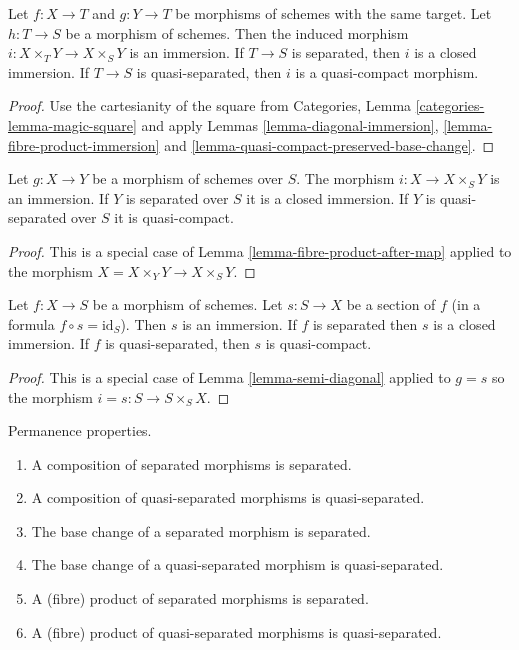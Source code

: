 \begin{lemma}
\label{lemma-fibre-product-after-map}
Let $f : X \to T$ and $g : Y \to T$ be morphisms of schemes
with the same target. Let $h : T \to S$ be a morphism of schemes.
Then the induced morphism $i : X \times_T Y \to X \times_S Y$ is
an immersion. If $T \to S$ is separated, then $i$ is a closed
immersion. If $T \to S$ is quasi-separated, then $i$ is a
quasi-compact morphism.
\end{lemma}

\begin{proof}
Use the cartesianity of the square from Categories,
Lemma \ref{categories-lemma-magic-square} and apply
Lemmas \ref{lemma-diagonal-immersion},
\ref{lemma-fibre-product-immersion} and
\ref{lemma-quasi-compact-preserved-base-change}.
\end{proof}

\begin{lemma}
\label{lemma-semi-diagonal}
Let $g : X \to Y$ be a morphism of schemes over $S$.
The morphism $i : X \to X \times_S Y$ is an immersion.
If $Y$ is separated over $S$ it is a closed immersion.
If $Y$ is quasi-separated over $S$ it is quasi-compact.
\end{lemma}

\begin{proof}
This is a special case of Lemma \ref{lemma-fibre-product-after-map}
applied to the morphism $X = X \times_Y Y \to X \times_S Y$.
\end{proof}

\begin{lemma}
\label{lemma-section-immersion}
Let $f : X \to S$ be a morphism of schemes.
Let $s : S \to X$ be a section of $f$ (in a formula $f \circ s = \text{id}_S$).
Then $s$ is an immersion.
If $f$ is separated then $s$ is a closed immersion.
If $f$ is quasi-separated, then $s$ is quasi-compact.
\end{lemma}

\begin{proof}
This is a special case of Lemma \ref{lemma-semi-diagonal} applied to
$g =s$ so the morphism $i = s : S \to S \times_S X$.
\end{proof}

\begin{lemma}
\label{lemma-separated-permanence}
Permanence properties.
\begin{enumerate}
\item A composition of separated morphisms is separated.
\item A composition of quasi-separated morphisms is quasi-separated.
\item The base change of a separated morphism is separated.
\item The base change of a quasi-separated morphism is quasi-separated.
\item A (fibre) product of separated morphisms is separated.
\item A (fibre) product of quasi-separated morphisms is quasi-separated.
\end{enumerate}
\end{lemma}

